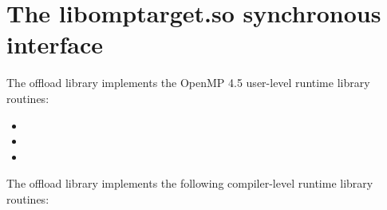 \section{The libomptarget.so synchronous interface}\label{sc:LibomptargetSync}

The offload library implements the OpenMP 4.5 user-level runtime library routines:
\begin{itemize}
  \item {}

  \item {}
  
  \item {}
\end{itemize}

The offload library implements the following compiler-level runtime library routines:
